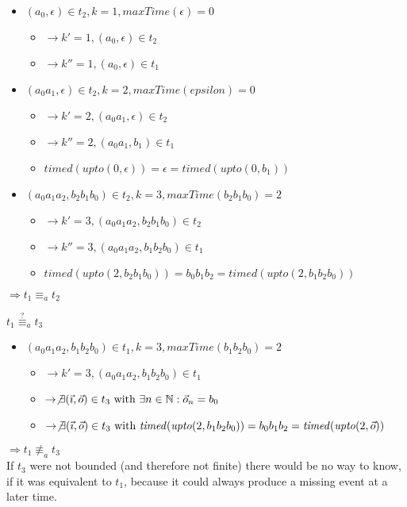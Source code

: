 \begin{exmp}[name=Observational Equivalence]
\begin{itemize}[label={}]
    \item \((a_0, \epsilon)               \in t_2, k = 1, \mathit{maxTime}(\epsilon) = 0\)
      \begin{itemize}[label={}]
        \item \(\rightarrow k' = 1, (a_0, \epsilon)     \in t_2\)
        \item \(\rightarrow k'' = 1, (a_0, \epsilon)     \in t_1\)
      \end{itemize}
    \item \((a_0a_1, \epsilon)            \in t_2, k = 2, \mathit{maxTime}(epsilon) = 0\)
      \begin{itemize}[label={}]
        \item \(\rightarrow k' = 2, (a_0a_1, \epsilon)    \in t_2\)
        \item \(\rightarrow k'' = 2, (a_0a_1, b_1)    \in t_1\)
        \item \(\mathit{timed}(\mathit{upto}(0, \epsilon)) = \epsilon = \mathit{timed}(\mathit{upto}(0, b_1))\)
      \end{itemize}
    \item \((a_0a_1a_2, b_2b_1b_0)        \in t_2, k = 3, \mathit{maxTime}(b_2b_1b_0) = 2\)
      \begin{itemize}[label={}]
        \item \(\rightarrow k' = 3, (a_0a_1a_2, b_2b_1b_0)    \in t_2\)
        \item \(\rightarrow k'' = 3, (a_0a_1a_2, b_1b_2b_0)    \in t_1\)
        \item \(\mathit{timed}(\mathit{upto}(2, b_2b_1b_0)) = b_0b_1b_2 = \mathit{timed}(\mathit{upto}(2, b_1b_2b_0))\)
      \end{itemize}
  \end{itemize}
  \(\Rightarrow t_1 \equiv_a t_2\)

  \(t_1 \stackrel{?}{\equiv}_a t_3\)
  \begin{itemize}[label={}]
    \item \((a_0a_1a_2,b_1b_2b_0)      \in t_1, k=3, \mathit{maxTime}(b_1b_2b_0) = 2\)
      \begin{itemize}[label={}]
        \item \(\rightarrow k' = 3, (a_0a_1a_2, b_1b_2b_0)    \in t_1\)
        \item \(\rightarrow \not\exists (\vec{\imath}, \vec{o}) \in t_3\ \text{with } \exists n \in \mathbb{N}: \vec{o}_n = b_0\)
        \item \(\rightarrow \not\exists (\vec{\imath}, \vec{o}) \in t_3\ \text{with } \mathit{timed}(\mathit{upto}(2, b_1b_2b_0)) = b_0b_1b_2 = \mathit{timed}(\mathit{upto}(2,\vec{o}))\)
      \end{itemize}
  \end{itemize}
  \(\Rightarrow t_1 \not\equiv_a t_3\)\\
  If \(t_3\) were not bounded (and therefore not finite) there would be no way to know, if it was equivalent to \(t_1\), because it could always produce a missing event at a later time.


\end{exmp}
